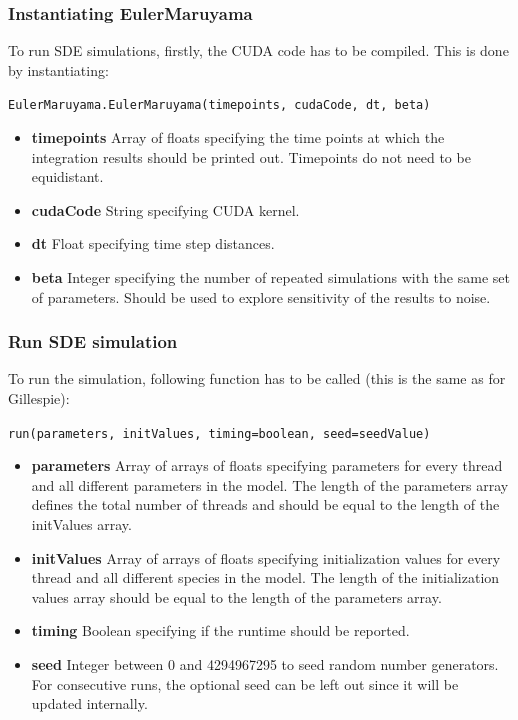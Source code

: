 \documentclass [11pt, a4paper, openany, twoside=off] {article}
\begin{document}
\subsubsection{Instantiating EulerMaruyama}
To run SDE simulations, firstly, the CUDA code has to be compiled. This is done by instantiating:
\begin{center}
\texttt{EulerMaruyama.EulerMaruyama(timepoints, cudaCode, dt, beta)}
\end{center}
\begin{itemize}
\item \textbf{timepoints} Array of floats specifying the time points at which the integration results should be printed out. Timepoints do not need to be equidistant.
\item \textbf{cudaCode} String specifying CUDA kernel.
\item \textbf{dt} Float specifying time step distances.
\item \textbf{beta} Integer specifying the number of repeated simulations with the same set of parameters. Should be used to explore sensitivity of the results to noise.
\end{itemize}

\subsubsection{Run SDE simulation}
To run the simulation, following function has to be called (this is the same as for Gillespie):
\begin{center}
\texttt{run(parameters, initValues, timing=boolean, seed=seedValue)}
\end{center}
\begin{itemize}
	\item \textbf{parameters} Array of arrays of floats specifying parameters for every thread and all different parameters in the model. The length of the parameters array defines the total number of threads and should be equal to the length of the initValues array.
	\item \textbf{initValues}  Array of arrays of floats specifying initialization values for every thread and all different species in the model. The length of the initialization values array should be equal to the length of the parameters array.
	\item \textbf{timing} Boolean specifying if the runtime should be reported.
	\item \textbf{seed} Integer between 0 and 4294967295 to seed random number generators. For consecutive runs, the optional seed can be left out since it will be updated internally.
\end{itemize}
\end{document}
